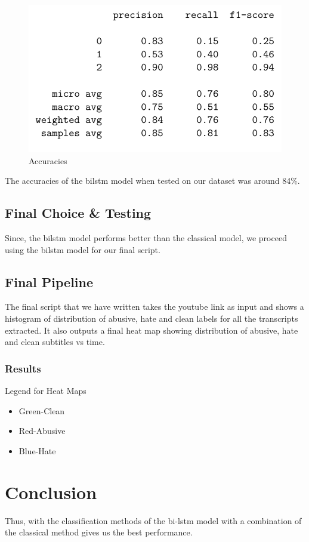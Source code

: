 \documentclass{article}[A4]
\begin{document}
\begin{figure}[!htb]
    \centering
    \includegraphics[scale=0.50]{bilstm.png}
    \caption{Accuracies}
    \label{fig:model_res}
\end{figure}

The accuracies of the bilstm model when tested on our dataset was around 84\%. 
\subsection{Final Choice \& Testing}
Since, the bilstm model performs better than the classical model, we proceed using the bilstm model for our final script.
\subsection{Final Pipeline}
The final script that we have written takes the youtube link as input and shows a histogram of distribution of abusive, hate and clean labels for all the transcripts extracted. It also outputs a final heat map showing distribution of abusive, hate and clean subtitles vs time.
\subsubsection{Results}
Legend for Heat Maps
\begin{itemize}
\item{Green-Clean}
\item{Red-Abusive}
\item{Blue-Hate}
\end{itemize}
\pagebreak[4]


\section{Conclusion}
Thus, with the classification methods of the bi-lstm model with a combination of the classical method gives us the best performance.
\end{document}
